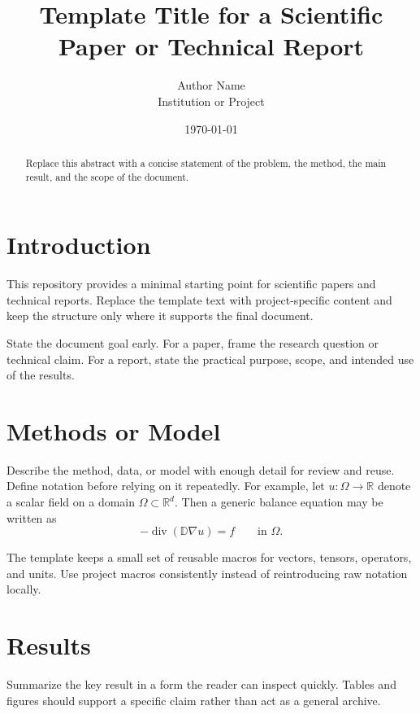 \documentclass[11pt,a4paper]{article}
\title{Template Title for a Scientific Paper or Technical Report}
\author{Author Name \\ Institution or Project}
\date{\today}
\def\div{\operatorname{div}}
\def\grad{\nabla}
\def\R{\mathbb R}
\def\tn#1{{\mathbb{#1}}}
\begin{document}
\begin{onehalfspacing}

\maketitle

\begin{abstract}
Replace this abstract with a concise statement of the problem, the method, the
main result, and the scope of the document.
\end{abstract}

\tableofcontents
\clearpage

\section{Introduction}
\label{sec:introduction}

This repository provides a minimal starting point for scientific papers and
technical reports. Replace the template text with project-specific content and
keep the structure only where it supports the final document.

State the document goal early. For a paper, frame the research question or
technical claim. For a report, state the practical purpose, scope, and intended
use of the results.

\section{Methods or Model}
\label{sec:methods}

Describe the method, data, or model with enough detail for review and reuse.
Define notation before relying on it repeatedly. For example, let
$u \colon \Omega \to \R$ denote a scalar field on a domain $\Omega \subset \R^d$.
Then a generic balance equation may be written as
\[
  -\div\left(\tn D \grad u\right) = f \qquad \text{in } \Omega.
\]

The template keeps a small set of reusable macros for vectors, tensors,
operators, and units. Use project macros consistently instead of reintroducing
raw notation locally.

\section{Results}
\label{sec:results}

Summarize the key result in a form the reader can inspect quickly. Tables and
figures should support a specific claim rather than act as a general archive.


\end{onehalfspacing}
\end{document}
